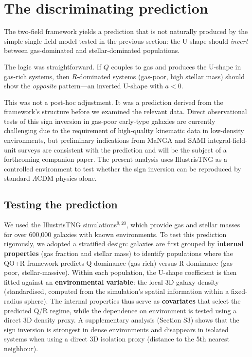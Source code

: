 \documentclass[11pt,a4paper]{article}
\begin{document}

\section*{The discriminating prediction}

The two-field framework yields a prediction that is not naturally produced by the simple single-field model tested in the previous section: the U-shape should \textit{invert} between gas-dominated and stellar-dominated populations.

The logic was straightforward. If $Q$ couples to gas and produces the U-shape in gas-rich systems, then $R$-dominated systems (gas-poor, high stellar mass) should show the \textit{opposite} pattern---an inverted U-shape with $a < 0$.

This was not a post-hoc adjustment. It was a prediction derived from the framework's structure before we examined the relevant data. Direct observational tests of this sign inversion in gas-poor early-type galaxies are currently challenging due to the requirement of high-quality kinematic data in low-density environments, but preliminary indications from MaNGA and SAMI integral-field-unit surveys are consistent with the prediction and will be the subject of a forthcoming companion paper. The present analysis uses IllustrisTNG as a controlled environment to test whether the sign inversion can be reproduced by standard $\Lambda$CDM physics alone.

\subsection*{Testing the prediction}

We used the IllustrisTNG simulations$^{9,20}$, which provide gas and stellar masses for over 600,000 galaxies with known environments. To test this prediction rigorously, we adopted a stratified design: galaxies are first grouped by \textbf{internal properties} (gas fraction and stellar mass) to identify populations where the QO+R framework predicts Q-dominance (gas-rich) versus R-dominance (gas-poor, stellar-massive). Within each population, the U-shape coefficient is then fitted against an \textbf{environmental variable}: the local 3D galaxy density (standardised, computed from the simulation's spatial information within a fixed-radius sphere). The internal properties thus serve as \textbf{covariates} that select the predicted Q/R regime, while the dependence on environment is tested using a direct 3D density proxy. A supplementary analysis (Section S3) shows that the sign inversion is strongest in dense environments and disappears in isolated systems when using a direct 3D isolation proxy (distance to the 5th nearest neighbour).
\end{document}
